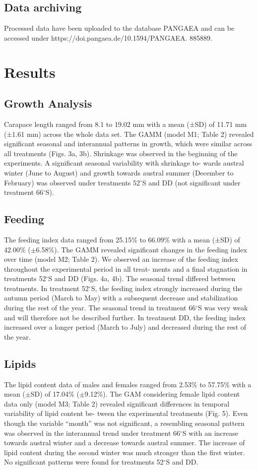\subsection{Data archiving} 
Processed data have been uploaded to the database PANGAEA and can be accessed under https://doi.pangaea.de/10.1594/PANGAEA. 885889. 
 
\section{Results}

\subsection{Growth Analysis} 
Carapace length ranged from 8.1 to 19.02 mm with a mean (±SD) of 11.71 mm (±1.61 mm) across the whole data set. The GAMM (model M1; Table 2) revealed significant seasonal and interannual patterns in growth, which were similar across all treatments (Figs. 3a, 3b). Shrinkage was observed in the beginning of the experiments. A significant seasonal variability with shrinkage to- wards austral winter (June to August) and growth towards austral summer (December to February) was observed under treatments 52$^{\circ}$S and DD (not significant under treatment 66$^{\circ}$S).

\subsection{Feeding}
The feeding index data ranged from 25.15\% to 66.09\% with a mean (±SD) of 42.00\% ($\pm$6.58\%). 
The GAMM revealed significant changes in the feeding index over time (model M2; Table 2). We observed an increase of the feeding index throughout the experimental period in all treat- ments and a final stagnation in treatments 52$^{\circ}$S and DD (Figs. 4a, 4b). The seasonal trend differed between treatments. In treatment 52$^{\circ}$S, the feeding index strongly increased during the autumn period (March to May) with a subsequent decrease and stabilization during the rest of the year. The seasonal trend in treatment 66$^{\circ}$S was very weak and will therefore not be described further. In treatment DD, the feeding index increased over a longer period (March to July) and decreased during the rest of the year.

\subsection{Lipids}
The lipid content data of males and females ranged from 2.53\% to 57.75\% with a mean ($\pm$SD) of 17.04\% ($\pm$9.12\%). The GAM considering female lipid content data only (model M3; Table 2) revealed significant differences in temporal variability of lipid content be- tween the experimental treatments (Fig. 5). Even though the variable “month” was not significant, a resembling seasonal pattern was observed in the interannual trend under treatment 66$^{\circ}$S with an increase towards austral winter and a decrease towards austral summer. The increase of lipid content during the second winter was much stronger than the first winter. No significant patterns were found for treatments 52$^{\circ}$S and DD.

